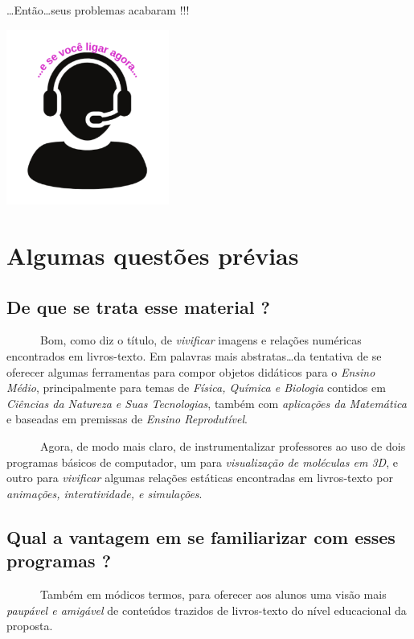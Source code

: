 \documentclass[
  letterpaper,
  DIV=11,
  numbers=noendperiod]{scrreprt}
\begin{document}
\ldots Então\ldots seus problemas acabaram !!!

\includegraphics[width=0.4\textwidth,height=\textheight]{telemark.png}


\chapter{Algumas questões prévias}\label{algumas-questuxf5es-pruxe9vias}

\section{De que se trata esse material
?}\label{de-que-se-trata-esse-material}

~~~~~~Bom, como diz o título, de \emph{vivificar} imagens e relações
numéricas encontrados em livros-texto. Em palavras mais
abstratas\ldots da tentativa de se oferecer algumas ferramentas para
compor objetos didáticos para o \emph{Ensino Médio}, principalmente para
temas de \emph{Física, Química e Biologia} contidos em \emph{Ciências da
Natureza e Suas Tecnologias}, também com \emph{aplicações da Matemática}
e baseadas em premissas de \emph{Ensino Reprodutível}.

~~~~~~Agora, de modo mais claro, de instrumentalizar professores ao uso
de dois programas básicos de computador, um para \emph{visualização de
moléculas em 3D}, e outro para \emph{vivificar} algumas relações
estáticas encontradas em livros-texto por \emph{animações,
interatividade, e simulações}.

\section{Qual a vantagem em se familiarizar com esses programas
?}\label{qual-a-vantagem-em-se-familiarizar-com-esses-programas}

~~~~~~Também em módicos termos, para oferecer aos alunos uma visão mais
\emph{paupável e amigável} de conteúdos trazidos de livros-texto do
nível educacional da proposta.
\end{document}
